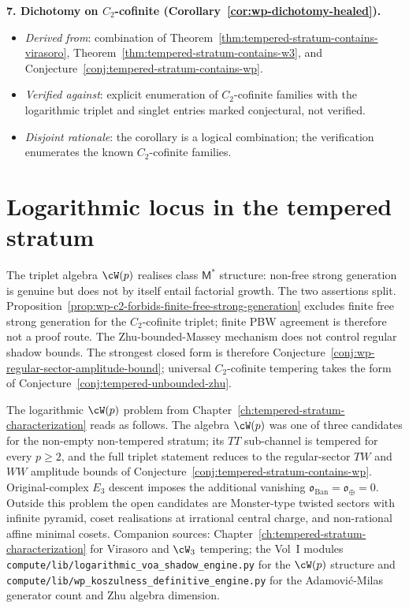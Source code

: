 \textbf{7. Dichotomy on $C_2$-cofinite
(Corollary~\ref{cor:wp-dichotomy-healed}).}
\begin{itemize}[nosep]
\item \emph{Derived from}: combination of
 Theorem~\ref{thm:tempered-stratum-contains-virasoro},
 Theorem~\ref{thm:tempered-stratum-contains-w3}, and
 Conjecture~\ref{conj:tempered-stratum-contains-wp}.
\item \emph{Verified against}: explicit enumeration of
 $C_2$-cofinite families with the logarithmic triplet and singlet
 entries marked conjectural, not verified.
\item \emph{Disjoint rationale}: the corollary is a logical
 combination; the verification enumerates the known
 $C_2$-cofinite families.
\end{itemize}

\section{Logarithmic locus in the tempered stratum}
\label{sec:wp-tempered-stratum-location}

\begin{remark}
\label{rem:wp-triplet-reduction}
The triplet algebra $\cW(p)$ realises class $\mathsf{M}^*$ structure:
non-free strong generation is genuine but does not by itself entail
factorial growth. The two assertions split.
Proposition~\ref{prop:wp-c2-forbids-finite-free-strong-generation}
excludes finite free strong generation for the $C_2$-cofinite triplet;
finite PBW agreement is therefore not a proof route. The
Zhu-bounded-Massey mechanism does not control regular shadow bounds.
The strongest closed form is therefore
Conjecture~\ref{conj:wp-regular-sector-amplitude-bound}; universal
$C_2$-cofinite tempering takes the form of
Conjecture~\ref{conj:tempered-unbounded-zhu}.
\end{remark}

The logarithmic $\cW(p)$ problem from
Chapter~\ref{ch:tempered-stratum-characterization} reads as follows.
The algebra $\cW(p)$ was one of three candidates for the non-empty
non-tempered stratum; its $TT$ sub-channel is tempered for every
$p \ge 2$, and the full triplet statement reduces to the regular-sector
$TW$ and $WW$ amplitude bounds of
Conjecture~\ref{conj:tempered-stratum-contains-wp}. Original-complex
$E_3$ descent imposes the additional vanishing
$\mathfrak{o}_{\mathrm{Ban}}=\mathfrak{o}_{\oplus}=0$. Outside this
problem the open candidates are Monster-type twisted sectors with
infinite pyramid, coset realisations at irrational central charge, and
non-rational affine minimal cosets. Companion sources:
Chapter~\ref{ch:tempered-stratum-characterization} for Virasoro and
$\cW_3$ tempering; the Vol~I modules
\texttt{compute/lib/logarithmic\_voa\_shadow\_engine.py} for the
$\cW(p)$ structure and
\texttt{compute/lib/wp\_koszulness\_definitive\_engine.py} for the
Adamovi\'c-Milas generator count and Zhu algebra dimension.


